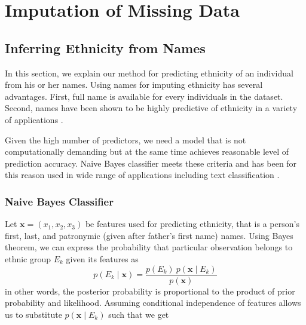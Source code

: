 \newpage
\section{Imputation of Missing Data} \label{sec:missing_data}
\subsection{Inferring Ethnicity from Names} \label{subsec:inferring_ethnicity}
In this section, we explain our method for predicting ethnicity of an individual from his or her names. Using names for imputing ethnicity has several advantages. First, full name  is available for every individuals in the dataset. Second, names have been shown to be highly predictive of ethnicity in a variety of applications \citep{mateos_review_2007, hofstra_sources_2017, hofstra_predicting_2018}. 

Given the high number of predictors, we need a model that is not  computationally demanding but at the same time achieves reasonable level of prediction accuracy. Naive Bayes classifier meets these criteria and has been for this reason used in wide range of applications including text classification  \citep{gentzkow_text_2019}.

\subsubsection{Naive Bayes Classifier}
Let  $\boldsymbol{x} = \left(x_1, x_2, x_3\right)$ be features used for predicting ethnicity, that is a person's first, last, and patronymic (given after father's first name) names. Using Bayes theorem, we can express the probability that particular observation  belongs to ethnic group $E_k$ given its features as
\begin{equation}
p(E_k \mid \mathbf{x}) = \frac{p(E_k) \ p(\mathbf{x} \mid E_k)}{p(\mathbf{x})}
\end{equation}
in other words, the posterior probability is proportional to the product of prior probability and likelihood. 
Assuming conditional independence of features allows us to substitute $p(\mathbf{x} \mid E_k)$ such that we get

